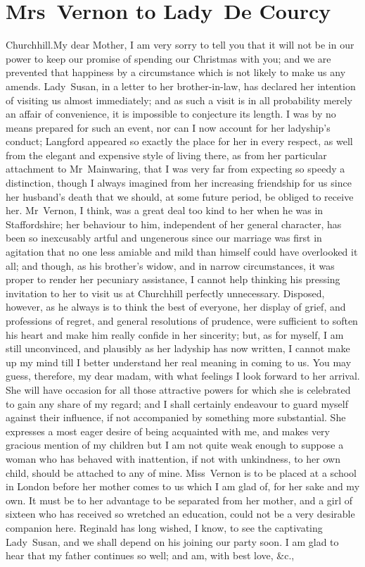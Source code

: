 \chapter{Mrs~Vernon to Lady~De Courcy}
	
	
\begin{mail}{Churchhill.}{My dear Mother,}
I am very sorry to tell you that it will not be in our power to keep our promise of spending our Christmas with you; and we are prevented that happiness by a circumstance which is not likely to make us any amends. Lady~Susan, in a letter to her brother-in-law, has declared her intention of visiting us almost immediately; and as such a visit is in all probability merely an affair of convenience, it is impossible to conjecture its length. I was by no means prepared for such an event, nor can I now account for her ladyship's conduct; Langford appeared so exactly the place for her in every respect, as well from the elegant and expensive style of living there, as from her particular attachment to Mr~Mainwaring, that I was very far from expecting so speedy a distinction, though I always imagined from her increasing friendship for us since her husband's death that we should, at some future period, be obliged to receive her. Mr~Vernon, I think, was a great deal too kind to her when he was in Staffordshire; her behaviour to him, independent of her general character, has been so inexcusably artful and ungenerous since our marriage was first in agitation that no one less amiable and mild than himself could have overlooked it all; and though, as his brother's widow, and in narrow circumstances, it was proper to render her pecuniary assistance, I cannot help thinking his pressing invitation to her to visit us at Churchhill perfectly unnecessary. Disposed, however, as he always is to think the best of everyone, her display of grief, and professions of regret, and general resolutions of prudence, were sufficient to soften his heart and make him really confide in her sincerity; but, as for myself, I am still unconvinced, and plausibly as her ladyship has now written, I cannot make up my mind till I better understand her real meaning in coming to us. You may guess, therefore, my dear madam, with what feelings I look forward to her arrival. She will have occasion for all those attractive powers for which she is celebrated to gain any share of my regard; and I shall certainly endeavour to guard myself against their influence, if not accompanied by something more substantial. She expresses a most eager desire of being acquainted with me, and makes very gracious mention of my children but I am not quite weak enough to suppose a woman who has behaved with inattention, if not with unkindness, to her own child, should be attached to any of mine. Miss~Vernon is to be placed at a school in London before her mother comes to us which I am glad of, for her sake and my own. It must be to her advantage to be separated from her mother, and a girl of sixteen who has received so wretched an education, could not be a very desirable companion here. Reginald has long wished, I know, to see the captivating Lady~Susan, and we shall depend on his joining our party soon. I am glad to hear that my father continues so well; and am, with best love, \&c., 
\end{mail}